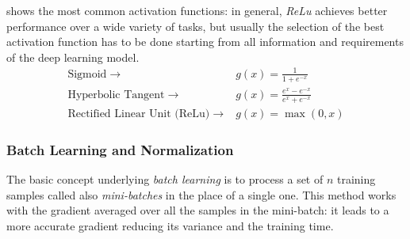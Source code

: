  shows the most common activation functions: in general, \textit{ReLu}  achieves better performance over a wide variety of tasks, but usually the selection of the best activation function has to be done starting from all information and requirements of the deep learning model.
\begin{equation}\label{eq:activation}
\begin{aligned}
\text{Sigmoid} \;\rightarrow\;& g(x) = \frac{1}{1+ e^{-x}}\\
\text{Hyperbolic Tangent} \;\rightarrow\;& g(x) = \frac{e^x-e^{-x}}{e^x+e^{-x}}\\
\text{Rectified Linear Unit (ReLu)} \;\rightarrow\;& g(x) = \max(0,x)
\end{aligned}
\end{equation}

\subsubsection{Batch Learning and Normalization}
The basic concept underlying \textit{batch learning} \cite{stanford2019cs231n} is to process a set of $n$ training samples called also \textit{mini-batches} in the place of a single one. This method works with the gradient averaged over all the samples in the mini-batch: it leads to a more accurate gradient reducing its variance and the training time.

